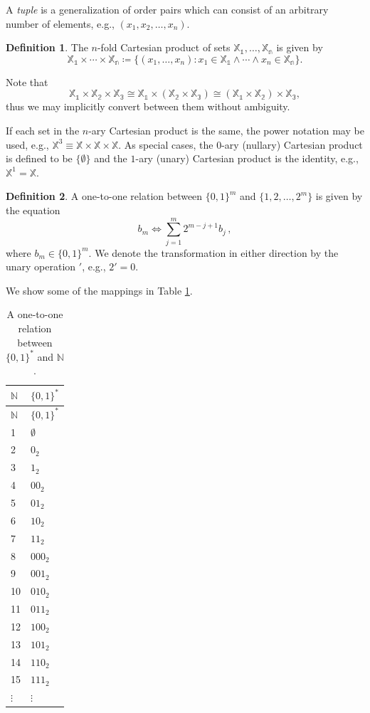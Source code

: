 \documentclass[
]{article}
\theoremstyle{definition}
\newtheorem{definition}{Definition}[section]
\theoremstyle{definition}
\theoremstyle{definition}
\theoremstyle{definition}
\theoremstyle{remark}
\begin{document}
A \emph{tuple} is a generalization of order pairs which can consist of an
arbitrary number of elements, e.g., \((x_1,x_2,\ldots,x_n)\).

\begin{definition}
The \(n\)-fold Cartesian product of sets \(\mathbb{X_1},\ldots,\mathbb{X_n}\) is
given by
\[
\mathbb{X_1} \times \cdots \times \mathbb{X_n} \coloneqq
  \bigl\{(x_1,\ldots,x_n) : x_1 \in \mathbb{X_1} \land \cdots
  \land x_n \in \mathbb{X_n}\bigr\}.
\]
\end{definition}

Note that
\[
\mathbb{X_1} \times \mathbb{X_2} \times \mathbb{X_3} \cong
  \mathbb{X_1} \times \left(\mathbb{X_2} \times \mathbb{X_3}\right) \cong
  \left(\mathbb{X_1} \times \mathbb{X_2}\right) \times \mathbb{X_3},
\]
thus we may implicitly convert between them without ambiguity.

If each set in the \(n\)-ary Cartesian product is the same, the power notation may
be used, e.g., \(\mathbb{X}^3 \equiv \mathbb{X} \times \mathbb{X} \times \mathbb{X}\).
As special cases, the \(0\)-ary (nullary) Cartesian product is defined to be
\(\{ \emptyset \}\) and the \(1\)-ary (unary) Cartesian product is the identity,
e.g., \(\mathbb{X}^1 = \mathbb{X}\).

\begin{definition}
A one-to-one relation between \(\{0,1\}^m\) and \(\{1,2,\ldots,2^m\}\) is given
by the equation
\[
b_m \Longleftrightarrow \sum_{j=1}^{m} 2^{m - j + 1} b_j\,,
\]
where \(b_m \in \{0,1\}^m\).
We denote the transformation in either direction by the unary operation \('\),
e.g., \(2' = 0\).
\end{definition}

We show some of the mappings in Table \ref{tab:convert}.

\begin{longtable}[]{@{}ll@{}}
\caption{\label{tab:convert} A one-to-one relation between \(\{0,1\}^*\) and \(\mathbb{N}\).}\tabularnewline
\toprule()
\(\mathbb{N}\) & \(\{0,1\}^*\) \\
\midrule()
\endfirsthead
\toprule()
\(\mathbb{N}\) & \(\{0,1\}^*\) \\
\midrule()
\endhead
1 & \(\emptyset\) \\
2 & \(0_2\) \\
3 & \(1_2\) \\
4 & \(00_2\) \\
5 & \(01_2\) \\
6 & \(10_2\) \\
7 & \(11_2\) \\
8 & \(000_2\) \\
9 & \(001_2\) \\
10 & \(010_2\) \\
11 & \(011_2\) \\
12 & \(100_2\) \\
13 & \(101_2\) \\
14 & \(110_2\) \\
15 & \(111_2\) \\
\(\vdots\) & \(\vdots\) \\
\bottomrule()
\end{longtable}
\end{document}
